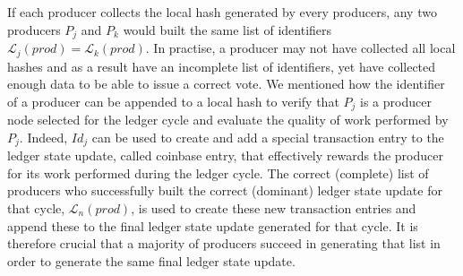 If each producer collects the local hash generated by every producers, any two producers $P_j$ and $P_k$ would built the same list of identifiers $\mathcal{L}_j(prod) = \mathcal{L}_k(prod)$. In practise, a producer may not have collected all local hashes and as a result have an incomplete list of identifiers, yet have collected enough data to be able to issue a correct vote. We mentioned how the identifier of a producer can be appended to a local hash to verify that $P_j$ is a producer node selected for the ledger cycle and evaluate the quality of work performed by $P_j$. Indeed, $Id_j$ can be used to create and add a special transaction entry to the ledger state update, called coinbase entry, that effectively rewards the producer for its work performed during the ledger cycle. The correct (complete) list of producers who successfully built the correct (dominant) ledger state update for that cycle, $\mathcal{L}_n(prod)$,  is used to create these new transaction entries and append these to the final ledger state update generated for that cycle. It is therefore crucial that a majority of producers succeed in generating that list in order to generate the same final ledger state update. \\ 


